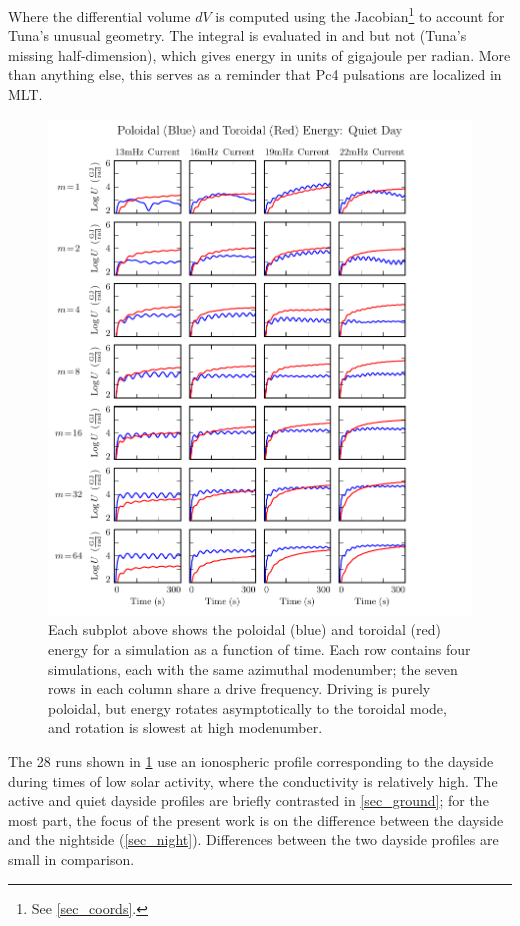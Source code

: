 Where the differential volume $dV$ is computed using the Jacobian\footnote{See
\cref{sec_coords}. } to account for Tuna's unusual geometry. The integral is
evaluated in \lysakx and \lysakz but not \lysaky (Tuna's missing
half-dimension), which gives energy in units of gigajoule per radian. More than
anything else, this serves as a reminder that Pc4 pulsations are localized in
MLT. 

\begin{figure}[!htb]
  \centering
  \includegraphics[width=\textwidth]{figures/U_day.pdf}
  \caption[Dayside Poloidal and Toroidal Energy]{
    Each subplot above shows the poloidal (blue) and toroidal (red) energy for
    a simulation as a function of time. Each row contains four simulations,
    each with the same azimuthal modenumber; the seven rows in each column
    share a drive frequency. Driving is purely poloidal, but energy rotates
    asymptotically to the toroidal mode, and rotation is slowest at high
    modenumber. 
  }
  \label{fig_U_day}
\end{figure}

The 28 runs shown in \cref{fig_U_day} use an ionospheric profile corresponding
to the dayside during times of low solar activity, where the conductivity is
relatively high. The active and quiet dayside profiles are briefly contrasted
in \cref{sec_ground}; for the most part, the focus of the present work is on
the difference between the dayside and the nightside (\cref{sec_night}).
Differences between the two dayside profiles are small in comparison. 

